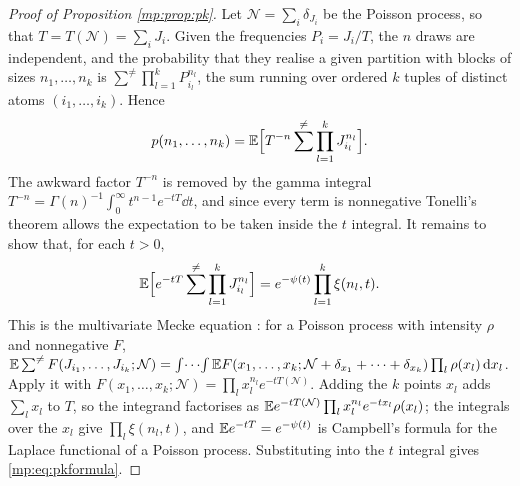 \begin{proof}[Proof of Proposition \ref{mp:prop:pk}]
Let $\mathcal N=\sum_i\delta_{J_i}$ be the Poisson process, so that $T=T(\mathcal N)=\sum_iJ_i$.
Given the frequencies $P_i=J_i/T$, the $n$ draws are independent, and the probability that
they realise a given partition with blocks of sizes $n_1,\dots,n_k$ is
$\sum^{\ne}\prod_{l=1}^kP_{i_l}^{n_l}$, the sum running over ordered $k$ tuples of distinct
atoms $(i_1,\dots,i_k)$. Hence
\[
p(n_1,\dots,n_k)=\mathbb{E}\Big[T^{-n}\sum^{\ne}\prod_{l=1}^kJ_{i_l}^{n_l}\Big].
\]
The awkward factor $T^{-n}$ is removed by the gamma integral
$T^{-n}=\Gamma(n)^{-1}\int_0^\infty t^{n-1}e^{-tT}\dd t$, and since every term is
nonnegative Tonelli's theorem allows the expectation to be taken inside the $t$ integral.
It remains to show that, for each $t>0$,
\[
\mathbb{E}\Big[e^{-tT}\sum^{\ne}\prod_{l=1}^kJ_{i_l}^{n_l}\Big]
=e^{-\psi(t)}\prod_{l=1}^k\xi(n_l,t).
\]
This is the multivariate Mecke equation \citep[Theorem 4.4]{mp:last2017}: for a Poisson
process with intensity $\rho$ and nonnegative $F$,
$\mathbb{E}\sum^{\ne}F(J_{i_1},\dots,J_{i_k};\mathcal N)
=\int\!\cdots\!\int\mathbb{E} F(x_1,\dots,x_k;\mathcal N+\delta_{x_1}+\dots+\delta_{x_k})
\prod_l\rho(x_l)\,\mathrm{d} x_l$. Apply it with
$F(x_1,\dots,x_k;\mathcal N)=\prod_lx_l^{n_l}e^{-tT(\mathcal N)}$. Adding the $k$ points
$x_l$ adds $\sum_lx_l$ to $T$, so the integrand factorises as
$\mathbb{E} e^{-tT(\mathcal N)}\prod_lx_l^{n_l}e^{-tx_l}\rho(x_l)$; the integrals over the $x_l$ give
$\prod_l\xi(n_l,t)$, and $\mathbb{E} e^{-tT}=e^{-\psi(t)}$ is Campbell's formula for the Laplace
functional of a Poisson process. Substituting into the $t$ integral gives
\eqref{mp:eq:pkformula}.
\end{proof}

